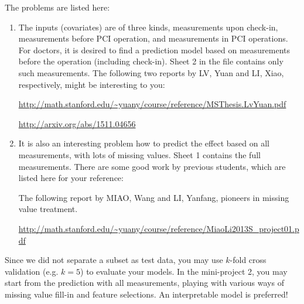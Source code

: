 \documentclass[11pt]{article}
\begin{document}
The problems are listed here:
\begin{enumerate}
\item The inputs (covariates) are of three kinds, measurements upon check-in, measurements before PCI operation, and measurements in PCI operations. For doctors, it is desired to find a prediction model based on measurements before the operation (including check-in). Sheet 2 in the file contains only such measurements.
\subitem The following two reports by LV, Yuan and LI, Xiao, respectively, might be interesting to you:

\url{http://math.stanford.edu/~yuany/course/reference/MSThesis.LvYuan.pdf} 

\url{http://arxiv.org/abs/1511.04656} 

\item It is also an interesting problem how to predict the effect based on all measurements, with lots of missing values. Sheet 1 contains the full measurements. There are some good work by previous students, which are listed here for your reference: 
%
%

\subitem The following report by MIAO, Wang and LI, Yanfang, pioneers in missing value treatment. 

\url{http://math.stanford.edu/~yuany/course/reference/MiaoLi2013S_project01.pdf}

\end{enumerate} 

Since we did not separate a subset as test data, you may use $k$-fold cross validation (e.g. $k=5$) to evaluate your models. In the mini-project 2, you may start from the prediction with all measurements, playing with various ways of missing value fill-in and feature selections. An interpretable model is preferred!

\end{document}
